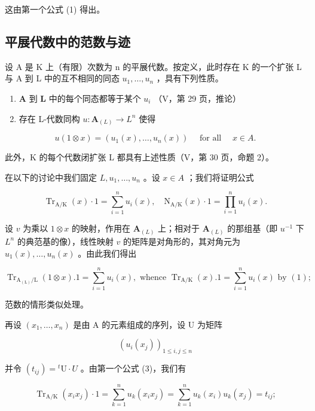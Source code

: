 这由第一个公式 (1) 得出。

\subsection{平展代数中的范数与迹}

设 A 是 K 上（有限）次数为 n 的平展代数。按定义，此时存在 K 的一个扩张 L 与 A 到 L 中的互不相同的同态 \(u_{1}, \ldots, u_{n}\) ，具有下列性质。

\begin{enumerate}
\def\labelenumi{\alph{enumi})}
\item
  \(\mathbf{A}\) 到 \(\mathbf{L}\) 中的每个同态都等于某个 \(u_{i}\) （V，第 29 页，推论）
\item
  存在 L-代数同构 \(u: \mathbf{A}_{(L)} \to L^n\) 使得
\end{enumerate}

\[
u (1 \otimes x) = \left(u _ {1} (x), \dots , u _ {n} (x)\right) \quad \text { for   all } \quad x \in A.
\]

此外，K 的每个代数闭扩张 L 都具有上述性质（V，第 30 页，命题 2）。

在以下的讨论中我们固定 \(L, u_1, \ldots, u_n\) 。设 \(x \in A\) ；我们将证明公式

\[
\operatorname{Tr} _ {\mathrm{A} / \mathrm{K}} (x) \cdot 1 = \sum_ {i = 1} ^ {n} u _ {i} (x), \quad \mathrm{N} _ {\mathrm{A} / \mathrm{K}} (x) \cdot 1 = \prod_ {i = 1} ^ {n} u _ {i} (x).\tag{3}
\]

设 \(v\) 为乘以 \(1 \otimes x\) 的映射，作用在 \(\mathbf{A}_{(L)}\) 上；相对于 \(\mathbf{A}_{(L)}\) 的那组基（即 \(u^{-1}\) 下 \(L^n\) 的典范基的像），线性映射 \(v\) 的矩阵是对角形的，其对角元为 \(u_1(x), \ldots, u_n(x)\) 。由此我们得出

\[
\operatorname{Tr} _ {\mathrm{A} _ {(\mathrm{L})} / \mathrm{L}} (1 \otimes x). 1 = \sum_ {i = 1} ^ {n} u _ {i} (x), \text { whence } \operatorname{Tr} _ {\mathrm{A} / \mathrm{K}} (x). 1 = \sum_ {i = 1} ^ {n} u _ {i} (x) \text { by } (1);
\]

范数的情形类似处理。

再设 \((x_{1},\ldots ,x_{n})\) 是由 A 的元素组成的序列，设 U 为矩阵

\[
\left(u _ {i} \left(x _ {j}\right)\right) _ {1 \leqslant i, j \leqslant n}
\]

并令 \((t_{ij}) = {}^t\mathrm{U} \cdot U\) 。由第一个公式 (3)，我们有

\[
\operatorname{Tr} _ {\mathrm{A} / \mathrm{K}} \left(x _ {i} x _ {j}\right) \cdot 1 = \sum_ {k = 1} ^ {n} u _ {k} \left(x _ {i} x _ {j}\right) = \sum_ {k = 1} ^ {n} u _ {k} \left(x _ {i}\right) u _ {k} \left(x _ {j}\right) = t _ {i j};
\]

